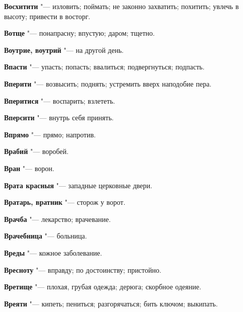 \begin{mymulticols}{2}
\noindent\textbf{Восхитити} "--- изловить; поймать; не законно захватить; похитить; увлечь в высоту; привести в восторг. 




\noindent\textbf{Вотще} "--- понапрасну; впустую; даром; тщетно. 




\noindent\textbf{Воутрие, воутрий} "--- на другой день. 




\noindent\textbf{Впасти} "--- упасть; попасть; ввалиться; подвергнуться; подпасть. 




\noindent\textbf{Вперити} "--- возвысить; поднять; устремить вверх наподобие пера. 




\noindent\textbf{Вперитися} "--- воспарить; взлететь. 




\noindent\textbf{Вперсити} "--- внутрь себя принять. 




\noindent\textbf{Впрямо} "--- прямо; напротив. 




\noindent\textbf{Врабий} "--- воробей. 




\noindent\textbf{Вран} "--- ворон. 




\noindent\textbf{Врата красныя} "--- западные церковные двери. 




\noindent\textbf{Вратарь, вратник} "--- сторож у ворот. 




\noindent\textbf{Врачба} "--- лекарство; врачевание. 




\noindent\textbf{Врачебница} "--- больница. 




\noindent\textbf{Вреды} "--- кожное заболевание. 




\noindent\textbf{Вресноту} "--- вправду; по достоинству; пристойно. 




\noindent\textbf{Вретище} "--- плохая, грубая одежда; дерюга; скорбное одеяние. 




\noindent\textbf{Вреяти} "--- кипеть; пениться; разгорячаться; бить ключом; выкипать. 





\end{mymulticols}
